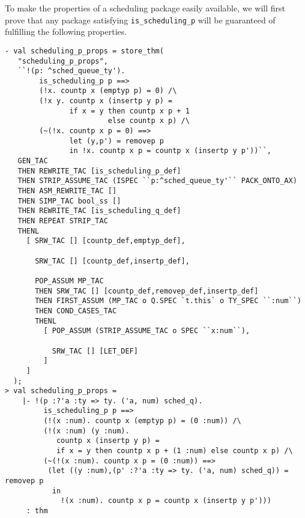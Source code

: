 To make the properties of a scheduling package
easily available, we will first prove that any package satisfying
{\tt is\_scheduling\_p} will be guaranteed of fulfilling the following
properties.
\begin{session}
\begin{verbatim}
- val scheduling_p_props = store_thm(
   "scheduling_p_props",
   ``!(p: ^sched_queue_ty').
        is_scheduling_p p ==>
        (!x. countp x (emptyp p) = 0) /\
        (!x y. countp x (insertp y p) =
               if x = y then countp x p + 1
                        else countp x p) /\
        (~(!x. countp x p = 0) ==>
               let (y,p') = removep p
               in !x. countp x p = countp x (insertp y p'))``,
   GEN_TAC
   THEN REWRITE_TAC [is_scheduling_p_def]
   THEN STRIP_ASSUME_TAC (ISPEC ``p:^sched_queue_ty'`` PACK_ONTO_AX)
   THEN ASM_REWRITE_TAC []
   THEN SIMP_TAC bool_ss []
   THEN REWRITE_TAC [is_scheduling_q_def]
   THEN REPEAT STRIP_TAC
   THENL
     [ SRW_TAC [] [countp_def,emptyp_def],

       SRW_TAC [] [countp_def,insertp_def],

       POP_ASSUM MP_TAC
       THEN SRW_TAC [] [countp_def,removep_def,insertp_def]
       THEN FIRST_ASSUM (MP_TAC o Q.SPEC `t.this` o TY_SPEC ``:num``)
       THEN COND_CASES_TAC
       THENL
         [ POP_ASSUM (STRIP_ASSUME_TAC o SPEC ``x:num``),

           SRW_TAC [] [LET_DEF]
         ]
     ]
  );
> val scheduling_p_props =
    |- !(p :?'a :ty => ty. ('a, num) sched_q).
         is_scheduling_p p ==>
         (!(x :num). countp x (emptyp p) = (0 :num)) /\
         (!(x :num) (y :num).
            countp x (insertp y p) =
            if x = y then countp x p + (1 :num) else countp x p) /\
         (~(!(x :num). countp x p = (0 :num)) ==>
          (let ((y :num),(p' :?'a :ty => ty. ('a, num) sched_q)) = removep p
           in
             !(x :num). countp x p = countp x (insertp y p')))
     : thm
\end{verbatim}
\end{session}

